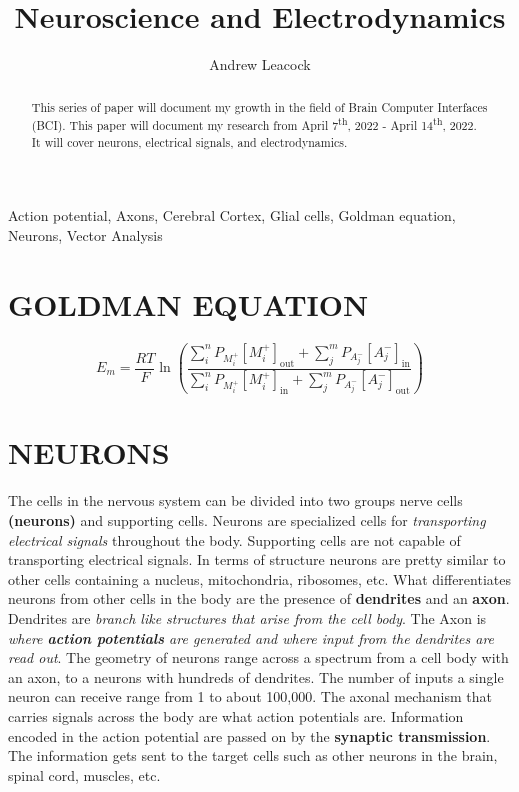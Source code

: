 \documentclass[english]{def}
\title{Neuroscience and Electrodynamics}
\author{Andrew Leacock
}
\begin{document}
\maketitle



\englishtitle

\begin{abstract}
	This series of paper will document my growth in the field of Brain Computer Interfaces (BCI). This paper will document my research from April 7\textsuperscript{th}, 2022 - April 14\textsuperscript{th}, 2022. It will cover neurons, electrical signals, and electrodynamics.
\end{abstract}

\begin{keywords}
	Action potential, Axons, Cerebral Cortex, Glial cells, Goldman equation, Neurons, Vector Analysis
\end{keywords}

\let\thefootnote\relax\footnotetext{\hspace*{-5mm}}

\section*{GOLDMAN EQUATION}
\[ E_{m}={\frac {RT}{F}}\ln {\left({\frac {\sum _{i}^{n}P_{M_{i}^{+}}[M_{i}^{+}]_{\mathrm {out} }+\sum _{j}^{m}P_{A_{j}^{-}}[A_{j}^{-}]_{\mathrm {in} }}{\sum _{i}^{n}P_{M_{i}^{+}}[M_{i}^{+}]_{\mathrm {in} }+\sum _{j}^{m}P_{A_{j}^{-}}[A_{j}^{-}]_{\mathrm {out} }}}\right)}\]


\section{NEURONS}
The cells in the nervous system can be divided into two groups nerve cells \textbf{(neurons)} and supporting cells. Neurons are specialized cells for \emph{transporting electrical signals} throughout the body. Supporting cells are not capable of transporting electrical signals. In terms of structure neurons are pretty similar to other cells containing a nucleus, mitochondria, ribosomes, etc. What differentiates neurons from other cells in the body are the presence of \textbf{dendrites} and an \textbf{axon}. Dendrites are \emph{branch like structures that arise from the cell body}. The Axon is \emph{where \textbf{action potentials} are generated and where input from the dendrites are read out}. The geometry of neurons range across a spectrum from a cell body with an axon, to a neurons with hundreds of dendrites. The number of inputs a single neuron can receive range from 1 to about 100,000. The axonal mechanism that carries signals across the body are what action potentials are. Information encoded in the action potential are passed on by the \textbf{synaptic transmission}. The information gets sent to the target cells such as other neurons in the brain, spinal cord, muscles, etc. 
\end{document}
